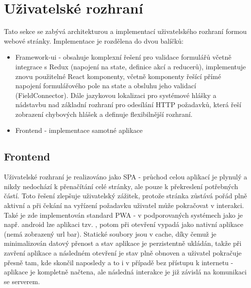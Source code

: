 
\section{Uživatelské rozhraní}
Tato sekce se zabývá architekturou a implementací uživatelského rozhraní formou webové stránky. Implementace je rozdělena do dvou balíčků:
\begin{itemize}
    \item Framework-ui - obsahuje komplexní řešení pro validace formulářů včetně integrace s Redux (napojení na state, definice akcí a reducerů), implementuje znovu použitelné React komponenty, včetně komponenty řešící přímé napojení formulářového pole na state a obsluhu jeho validací (FieldConnector). Dále jazykovou lokalizaci pro systémové hlášky a nádstavbu nad základní rozhraní pro odesílání HTTP požadavků, která řeší zobrazení chybových hlášek a definuje flexibilnější rozhraní.
    \item Frontend - implementace samotné aplikace
\end{itemize}

\subsection{Frontend}
Uživatelské rozhraní je realizováno jako SPA - průchod celou aplikací je plynulý a nikdy nedochází k přenačítání celé stránky, ale pouze k překreslení potřebných částí. Toto řešení zlepšuje uživatelský zážitek, protože stránka zůstává pořád plně aktivní a při čekání na vyřízení požadavku uživatel může pokračovat v interakci. Také je zde implementován standard PWA - v podporovaných systémech jako je např. android lze aplikaci tzv. , potom při otevření vypadá jako nativní aplikace (nemá zobrazený url bar). Statické soubory jsou v cache, díky čemuž je minimalizován datový přenost a stav aplikace je perzistentně ukládán, takže při zavření aplikace a následném otevření je stav plně obnoven a uživatel pokračuje přesně tam, kde skončil naposledy a to i v případě bez přístupu k internetu - aplikace je kompletně načtena, ale následná interakce je již závislá na komunikaci se serverem.

